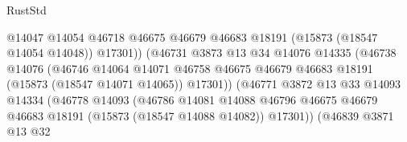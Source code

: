 \begin{lexlean}{RustStd}
\begin{coremodule}
                                            @14047
                                            @14054
                                            @46718
                                            @46675
                                            @46679
                                            @46683
                                            @18191
                                            (@15873 (@18547 @14054 @14048))
                                            @17301))
                                        (@46731
                                          @3873
                                          @13
                                          @34
                                          @14076
                                          @14335
                                          (@46738
                                            @14076
                                            (@46746
                                              @14064
                                              @14071
                                              @46758
                                              @46675
                                              @46679
                                              @46683
                                              @18191
                                              (@15873 (@18547 @14071 @14065))
                                              @17301))
                                          (@46771
                                            @3872
                                            @13
                                            @33
                                            @14093
                                            @14334
                                            (@46778
                                              @14093
                                              (@46786
                                                @14081
                                                @14088
                                                @46796
                                                @46675
                                                @46679
                                                @46683
                                                @18191
                                                (@15873 (@18547 @14088 @14082))
                                                @17301))
                                            (@46839
                                              @3871
                                              @13
                                              @32

\end{coremodule}
\end{lexlean}

